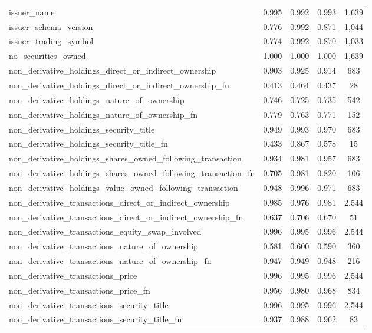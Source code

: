 \documentclass[journal, onecolumn]{IEEEtran}
\begin{document}
\begin{small}
\begin{longtable}{lcccc}
issuer\_name & 0.995 & 0.992 & 0.993 & 1,639 \\
issuer\_schema\_version & 0.776 & 0.992 & 0.871 & 1,044 \\
issuer\_trading\_symbol & 0.774 & 0.992 & 0.870 & 1,033 \\
no\_securities\_owned & 1.000 & 1.000 & 1.000 & 1,639 \\
non\_derivative\_holdings\_direct\_or\_indirect\_ownership & 0.903 & 0.925 & 0.914 & 683 \\
non\_derivative\_holdings\_direct\_or\_indirect\_ownership\_fn & 0.413 & 0.464 & 0.437 & 28 \\
non\_derivative\_holdings\_nature\_of\_ownership & 0.746 & 0.725 & 0.735 & 542 \\
non\_derivative\_holdings\_nature\_of\_ownership\_fn & 0.779 & 0.763 & 0.771 & 152 \\
non\_derivative\_holdings\_security\_title & 0.949 & 0.993 & 0.970 & 683 \\
non\_derivative\_holdings\_security\_title\_fn & 0.433 & 0.867 & 0.578 & 15 \\
non\_derivative\_holdings\_shares\_owned\_following\_transaction & 0.934 & 0.981 & 0.957 & 683 \\
non\_derivative\_holdings\_shares\_owned\_following\_transaction\_fn & 0.705 & 0.981 & 0.820 & 106 \\
non\_derivative\_holdings\_value\_owned\_following\_transaction & 0.948 & 0.996 & 0.971 & 683 \\
non\_derivative\_transactions\_direct\_or\_indirect\_ownership & 0.985 & 0.976 & 0.981 & 2,544 \\
non\_derivative\_transactions\_direct\_or\_indirect\_ownership\_fn & 0.637 & 0.706 & 0.670 & 51 \\
non\_derivative\_transactions\_equity\_swap\_involved & 0.996 & 0.995 & 0.996 & 2,544 \\
non\_derivative\_transactions\_nature\_of\_ownership & 0.581 & 0.600 & 0.590 & 360 \\
non\_derivative\_transactions\_nature\_of\_ownership\_fn & 0.947 & 0.949 & 0.948 & 216 \\
non\_derivative\_transactions\_price & 0.996 & 0.995 & 0.996 & 2,544 \\
non\_derivative\_transactions\_price\_fn & 0.956 & 0.980 & 0.968 & 834 \\
non\_derivative\_transactions\_security\_title & 0.996 & 0.995 & 0.996 & 2,544 \\
non\_derivative\_transactions\_security\_title\_fn & 0.937 & 0.988 & 0.962 & 83 \\

\end{longtable}
\end{small}
\end{document}
